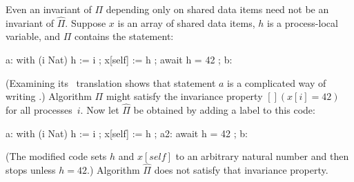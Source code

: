\documentclass[fleqn,leqno]{article}
\begin{document}
Even an invariant of $\Pi$ depending only on shared data items need
not be an invariant of $\widehat{\Pi}$.  Suppose $x$ is an array
of shared data items, $h$  is a process-local variable, and $\Pi$
contains the statement:
\begin{display}
\begin{nopcal}
a: with (i \in Nat) { h := i } ;
   x[self] := h ;
   await h = 42 ;
b: 
\end{nopcal}
\begin{tlatex}
%
%
%
\end{tlatex}
\end{display}
(Examining its \tlaplus\ translation shows that statement $a$ is a
complicated way of writing .)  Algorithm
$\Pi$ might satisfy the invariance property $[](x[i] = 42)$ for all
processes~$i$.  Now let $\widehat{\Pi}$ be obtained by adding a label
to this code:
\begin{display}
\begin{nopcal}
a:  with (i \in Nat) { h := i } ;
    x[self] := h ;
a2: await h = 42 ;
b:
\end{nopcal}
\begin{tlatex}
%
%
%
\end{tlatex}
\end{display}
(The modified code sets $h$ and $x[self]$ to an arbitrary natural number and
then stops unless $h=42$.)  Algorithm $\widehat{\Pi}$ does not satisfy that
invariance property.
\end{document}
